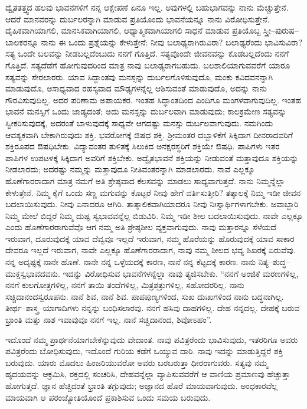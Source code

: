 ದ್ವೈತತತ್ತ್ವದ ಹಲವು ಭಾವನೆಗಳಿಗೆ ನನ್ನ ಆಕ್ಷೇಪಣೆ ಏನೂ ಇಲ್ಲ. ಅವುಗಳಲ್ಲಿ ಬಹುಭಾಗವನ್ನು ನಾನು ಮೆಚ್ಚುತ್ತೇನೆ. ಆದರೆ ಮಾನವರನ್ನು ದುರ್ಬಲರನ್ನಾಗಿ ಮಾಡುವ ಪ್ರತಿಯೊಂದು ಭಾವನೆಯನ್ನೂ ನಾನು ವಿರೋಧಿಸುತ್ತೇನೆ. ದೈಹಿಕವಾಗಿಯಾಗಲಿ, ಮಾನಸಿಕವಾಗಿಯಾಗಲಿ, ಆಧ್ಯಾತ್ಮಿಕವಾಗಿಯಾಗಲಿ ಸಾಧನೆ ಮಾಡುವ ಪ್ರತಿಯೊಬ್ಬ ಸ್ತ್ರೀ–ಪುರುಷ–ಬಾಲಕರನ್ನೂ ನಾನು ಈ ಒಂದು ಪ್ರಶ್ನೆಯನ್ನು ಕೇಳುತ್ತೇನೆ: ನೀವು ಬಲಾಢ್ಯರಾಗಿರುವಿರಾ? ಬಲಾಢ್ಯರೆಂದು ಭಾವಿಸುವಿರಾ? ಸತ್ಯ ಒಂದೇ ಬಲವನ್ನು ನೀಡಬಲ್ಲದೆಂಬುದು ನನಗೆ ಗೊತ್ತಿದೆ. ಸತ್ಯವೊಂದೇ ಜೀವನವನ್ನು ಕೊಡಬಲ್ಲದೆಂದು ನನಗೆ ಗೊತ್ತಿದೆ. ಸತ್ಯದೆಡೆಗೆ ಹೋಗುವುದರಿಂದ ಮಾತ್ರ ನಾವು ಬಲಾಢ್ಯರಾಗಬಹುದು. ಬಲಶಾಲಿಯಾಗುವವರೆಗೆ ಯಾರೂ ಸತ್ಯವನ್ನು ಸೇರಲಾರರು. ಯಾವ ಸಿದ್ಧಾಂತವು ಮನಸ್ಸನ್ನು ದುರ್ಬಲಗೊಳಿಸುವುದೊ, ಮಂಕು ಕವಿದವನನ್ನಾಗಿ ಮಾಡುವುದೊ, ಅಸಾಧ್ಯವಾದ ರಹಸ್ಯವಾದ ಮೌಢ್ಯಗಳನ್ನೆಲ್ಲ ಆಶಿಸುವಂತೆ ಮಾಡುವುದೊ, ಅದನ್ನು ನಾನು ಗೌರವಿಸುವುದಿಲ್ಲ. ಅದರ ಪರಿಣಾಮ ಅಪಾಯಕರ. ಇಂತಹ ಸಿದ್ಧಾಂತದಿಂದ ಎಂದಿಗೂ ಮಂಗಳವಾಗುವುದಿಲ್ಲ. ಇಂತಹ ಭಾವನೆ ಮನಸ್ಸಿಗೆ ಒಂದು ಜಾಡ್ಯದಂತೆ; ಅದು ಮನಸ್ಸನ್ನು ದುರ್ಬಲವಾಗಿ ಮಾಡುವುದು; ಕಾಲಕ್ರಮೇಣ ಸತ್ಯವನ್ನು ಸ್ವೀಕರಿಸುವುದಕ್ಕೆ, ಅದರಂತೆ ಬಾಳುವುದಕ್ಕೆ ಸಾಧ್ಯವೇ ಆಗದಷ್ಟು ಮನಸ್ಸು ದುರ್ಬಲವಾಗುವುದು. ನಮಗಿಂದು ಆವಶ್ಯಕವಾಗಿ ಬೇಕಾಗಿರುವುದು ಶಕ್ತಿ. ಭವರೋಗಕ್ಕೆ ಔಷಧ ಶಕ್ತಿ. ಶ‍್ರೀಮಂತರ ದಬ್ಬಾಳಿಕೆಗೆ ಸಿಕ್ಕಿದಾಗ ದೀನರಾದವರಿಗೆ ಶಕ್ತಿರೂಪದ ಔಷಧಿಬೇಕು. ವಿದ್ಯಾವಂತರ ತುಳಿತಕ್ಕೆ ಸಿಲುಕಿದ ಅನಕ್ಷರಸ್ಥರಿಗೆ ಶಕ್ತಿಯೇ ಔಷಧಿ. ಪಾಪಿಗಳು ಇತರ ಪಾಪಿಗಳ ಉಪಟಳಕ್ಕೆ ಸಿಕ್ಕಿದಾಗ ಅವರಿಗೆ ಶಕ್ತಿಬೇಕು. ಅದ್ವೈತಭಾವನೆ ಶಕ್ತಿಯನ್ನು ನೀಡುವಂತೆ ಮತ್ತಾವುದೂ ಶಕ್ತಿಯನ್ನು ನೀಡಲಾರದು; ಅದರಷ್ಟು ನಮ್ಮನ್ನು ಮತ್ತಾವುದೂ ನೀತಿವಂತರನ್ನಾಗಿ ಮಾಡಲಾರದು. ನಾವೆ ಎಲ್ಲಕ್ಕೂ ಹೊಣೆಗಾರರಾದಾಗ ಮಾತ್ರ ನಮಗೆ ಅತಿ ಶ್ರೇಷ್ಠವಾದ ಕೆಲಸವನ್ನು ಮಾಡಲು ಸಾಧ್ಯವಾಗುತ್ತದೆ. ನಾನು ನಿಮ್ಮನ್ನೆಲ್ಲಾ ಕೇಳುತ್ತೇನೆ. ನಿಮ್ಮ ಕೈಗೆ ಒಂದು ಸಣ್ಣ ಮಗುವನ್ನು ಕೊಟ್ಟರೆ ನೀವು ಹೇಗೆ ವರ್ತಿಸುತ್ತೀರಿ? ತತ್ಕಾಲಕ್ಕೆ ನಿಮ್ಮ ಇಡೀ ಜೀವನ ಬದಲಾಯಿಸುವುದು. ನೀವು ಏನಾದರೂ ಆಗಿರಿ. ತಾತ್ಕಾಲಿಕವಾಗಿಯಾದರೂ ನೀವು ನಿಃಸ್ವಾರ್ಥಿಗಳಾಗಬೇಕು. ಜವಾಬ್ದಾರಿ ನಿಮ್ಮ ಮೇಲೆ ಬಿದ್ದರೆ ನಿಮ್ಮ ದುಷ್ಟ ಸ್ವಭಾವವನ್ನೆಲ್ಲ ಬಿಡುವಿರಿ. ನಿಮ್ಮ ಇಡೀ ಶೀಲ ಬದಲಾಯಿಸುವುದು. ನಾವೇ ಎಲ್ಲಕ್ಕೂ ಎಂದು ಹೊಣೆಗಾರರಾಗುವೆವೊ ಆಗ ನಮ್ಮ ಅತಿ ಶ್ರೇಷ್ಠಶೀಲ ವ್ಯಕ್ತವಾಗುವುದು. ನಾವು ಮತ್ತಾರನ್ನೂ ಸೆಳೆಯದೆ ಇರುವಾಗ, ದೂರುವುದಕ್ಕೆ ಯಾವ ದೆವ್ವವೂ ಇಲ್ಲದೆ ಇರುವಾಗ, ನಮ್ಮ ಹೊರೆಯನ್ನು ಹೊರುವುದಕ್ಕೆ ಯಾವ ಸಾಕಾರ ದೇವರೂ ಇಲ್ಲದೆ ಇರುವಾಗ, ನಾವೇ ಎಲ್ಲಕ್ಕೂ ಹೊಣೆಗಾರರಾದಾಗ, ನಾವು ನಮ್ಮ ಶೀಲದ ಭವ್ಯ ಶಿಖರಕ್ಕೆ ಏರುವೆವು. ನನ್ನ ಅದೃಷ್ಟಕ್ಕೆ ನಾನೇ ಹೊಣೆ. ನಾನೇ ನನ್ನ ಒಳ್ಳೆಯದಕ್ಕೆ ಕಾರಣ, ನಾನೆ ನನ್ನ ಕೆಟ್ಟದಕ್ಕೆ ಕಾರಣ. ನಾನು ನಿತ್ಯ–ಶುದ್ಧ–ಮುಕ್ತಸ್ವಭಾವದವನು. ಇದನ್ನು ವಿರೋಧಿಸುವ ಭಾವನೆಗಳನ್ನೆಲ್ಲಾ ನಾವು ತ್ಯಜಿಸಬೇಕು. “ನನಗೆ ಅಂಜಿಕೆ ಮರಣಗಳಿಲ್ಲ, ನನಗೆ ಕುಲಗೋತ್ರಗಳಿಲ್ಲ, ನನಗೆ ತಾಯಿ ತಂದೆಗಳಿಲ್ಲ, ಮಿತ್ರಶತ್ರುಗಳಿಲ್ಲ, ಸಹೋದರರಿಲ್ಲ. ನಾನು ಸಚ್ಚಿದಾನಂದಸ್ವರೂಪನು. ನಾನೆ ಶಿವ, ನಾನೆ ಶಿವ. ಪಾಪಪುಣ್ಯಗಳಿಂದ, ಸುಖ ದುಃಖಗಳಿಂದ ನಾನು ಬದ್ಧನಾಗಿಲ್ಲ. ತೀರ್ಥ–ಶಾಸ್ತ್ರ–ಯಾಗಾದಿಗಳು ನನ್ನನ್ನು ಬಂಧಿಸಲಾರವು. ನನಗೆ ಹಸಿವು ದಾಹಗಳಿಲ್ಲ. ದೇಹ ನನ್ನದಲ್ಲ. ದೇಹಕ್ಕೆ ಬರುವ ಭ್ರಾಂತಿ ಮತ್ತು ನಾಶ ಇವಾವುವೂ ನನಗೆ ಇಲ್ಲ. ನಾನೆ ಸಚ್ಚಿದಾನಂದ, ಶಿವೋಽಹಂ”.

ಇದೊಂದೆ ನಮ್ಮ ಪ್ರಾರ್ಥನೆಯಾಗಬೇಕೆನ್ನುವುದು ವೇದಾಂತ. ನಾವು ಪವಿತ್ರರೆಂದು ಭಾವಿಸುವುದು, ಇತರರಿಗೂ ಅವರು ಪವಿತ್ರರೆಂದು ಬೋಧಿಸುವುದು, ಇದೊಂದೆ ಗುರಿಯ ಕಡೆಗೆ ಒಯ್ಯುವ ದಾರಿ. ನಾವು ಇದನ್ನು ಮಾಡುತ್ತಿದ್ದರೆ ಶಕ್ತಿ ಬರುವುದು. ಯಾರು ಮೊದಲು ಹಿಂಜರಿಯುವರೋ ಅವರು ಬರಬರುತ್ತಾ ಧೀರರಾಗುವರು. ಸತ್ಯವು ನಮ್ಮ ಹೃದಯವನ್ನು ಆಕ್ರಮಿಸಿ, ರಕ್ತದಲ್ಲಿ ಸಂಚರಿಸಿ, ದೇಹವನ್ನೆಲ್ಲಾ ವ್ಯಾಪಿಸುವವರೆಗೆ ಆ ವಾಣಿಯ ಪ್ರಮಾಣವು ಹೆಚ್ಚುತ್ತಾ ಹೋಗುತ್ತದೆ. ಜ್ಞಾನ ಹೆಚ್ಚಿದಂತೆ ಭ್ರಾಂತಿ ತಗ್ಗುವುದು; ಅಜ್ಞಾನದ ಹೊರೆ ಮಾಯವಾಗುವುದು. ಅಂಧಕಾರವೆಲ್ಲ ಮಾಯವಾಗಿ ಆ ಪರಂಜ್ಯೋತಿಯೊಂದೆ ಪ್ರಕಾಶಿಸುವ ಒಂದು ಸಮಯ ಬರುವುದು.


